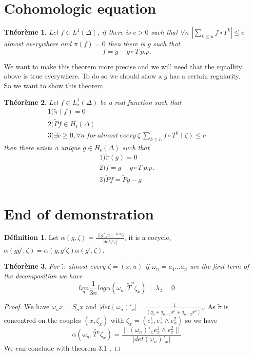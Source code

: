 \documentclass[12pt]{article}
\theoremstyle{plain}%
\newtheorem{thm}{Théorème}[section]
\theoremstyle{definition}
\newtheorem{dfnt}{Définition}[section]
\theoremstyle{remark}
\begin{document}
\section{Cohomologic equation}
\begin{thm}
Let $f \in L^1(\Delta)$, if there is $c>0$ such that $\forall n$ $|\sum_{k \leq n}f \circ T^k|\leq c$ almost everywhere and $\pi(f)=0$ then there is $g$ such that \[
f=g-g \circ T \ p.p.
\]
\end{thm}
We want to make this theorem more precise and we will need that the equallity above is true everywhere. To do so we should show a $g$ has a certain regularity. So we want to show this theorem
\begin{thm}
Let $f \in L^1_\pi(\Delta)$ be a real function such that \[
\begin{matrix}
1)\tilde{\pi}(f)=0 \\
2)\tilde{P}f \in H_\epsilon(\Delta)\\
3)\exists c \geq 0,\forall n \ for\ almost\ every\ \zeta \ \sum_{k \leq n}f \circ T^k(\zeta)\leq c
\end{matrix}
\]then there exists a unique $g \in H_\epsilon(\Delta)$ such that\[\begin{matrix}
1)\tilde{\pi}(g)=0 \\
2)f=g-g\circ T \ p.p. \\
3)\tilde{P}f=\tilde{P}g-g
\end{matrix}
\]
\end{thm}
\section{End of demonstration}

\begin{dfnt}
Let $\alpha (g,\zeta)=\frac{\| g'_x u\|**3}{|det g'_x|}$, it is a cocycle, $\alpha(g g', \zeta)=\alpha(g,g' \zeta) \alpha(g',\zeta)$.
\end{dfnt}

\begin{thm} For $\tilde{\pi}$ almost every $\zeta=(x,u)$ if $\omega_n=a_1 ... a_n$ are the first term of the decomposition we have \[
\underset{n}{lim} \frac{1}{3n} log \alpha(\omega_n,\tilde{T}^n \zeta_x)=\lambda_2=0
\]
\end{thm}

\begin{proof}
We have $\omega_n x = S_n x$ and $|det (\omega_n)'_x |=\frac{1}{(q_n+q_{n-1}x^1+q_{n-2}x^2)^3}$. As $\tilde{\pi}$ is concentred on the couples $(x,\zeta_x)$ with $\zeta_x=(e^1_x,e^1_x \land e^2_x)$ so we have \[
\alpha(\omega_n,\tilde{T^n}\zeta_x)=\frac{\| (\omega_n)'_x  e^1_x \land e^2_x\|}{| det (\omega_n)'_x |}
\]
We can conclude with theorem 3.1 .
\end{proof}
\end{document}
